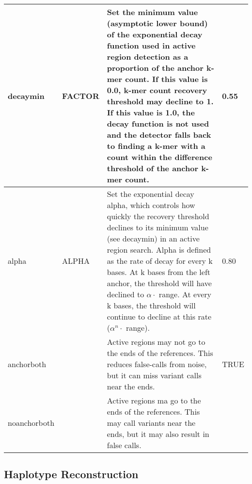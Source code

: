 \begin{small}
\begin{longtable}{|p{\optwidth}|p{\argwidth}|p{\dscwidth}|p{}|}
		\ddash{}decaymin & FACTOR &
		Set the minimum value (asymptotic lower bound) of the exponential decay function used in active region detection as a proportion of the anchor k-mer count. If this value is 0.0, k-mer count recovery threshold may decline to 1. If this value is 1.0, the decay function is not used and the detector falls back to finding a k-mer with a count within the difference threshold of the anchor k-mer count.
		& 0.55
		\\ \hline
		
		\ddash{}alpha & ALPHA &
		Set the exponential decay alpha, which controls how quickly the recovery threshold declines to its minimum value (see \ddash{}decaymin) in an active region search. Alpha is defined as the rate of decay for every k bases. At k bases from the left anchor, the threshold will have declined to $\alpha \cdot$ range. At every k bases, the threshold will continue to decline at this rate ($\alpha^n \cdot$ range).
		& 0.80
		\\ \hline
		
		\ddash{}anchorboth & &
		Active regions may not go to the ends of the references. This reduces false-calls from noise, but it can miss variant calls near the ends.
		& TRUE
		\\ \hline
		
		\ddash{}noanchorboth & &
		Active regions ma go to the ends of the references. This may call variants near the ends, but it may also result in false calls.
		&
		\\ \hline
		
	\end{longtable}
\end{small}



\subsection{Haplotype Reconstruction}
\label{sec.cmdline.opts.haplo}

